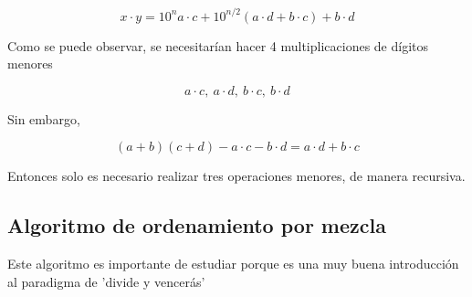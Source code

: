                 \begin{equation*}
                     x \cdot y = 10^{n} a \cdot c + 10^{n/2} (a \cdot d + b \cdot c) + b \cdot d 
                \end{equation*}

                Como se puede observar, se necesitarían hacer 4 multiplicaciones de dígitos menores

                \begin{equation*}
                     a \cdot c, \ a \cdot d, \ b \cdot c, \ b \cdot d
                \end{equation*}

                Sin embargo,
                
                \begin{equation*}
                    (a+b)(c+d) - a \cdot c - b \cdot d = a \cdot d + b \cdot c     
                \end{equation*}

                Entonces solo es necesario realizar tres operaciones menores, de manera recursiva.


            \subsection{Algoritmo de ordenamiento por mezcla}

                Este algoritmo es importante de estudiar porque es una muy buena introducción al paradigma de 'divide y vencerás'